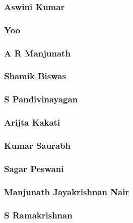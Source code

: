 \documentclass{article}
\begin{document}
\subsubsection{Aswini Kumar}


\subsubsection{Yoo}


\subsubsection{A R Manjunath}


\subsubsection{Shamik Biswas}


\subsubsection{S Pandivinayagan}


\subsubsection{Arijta Kakati}


\subsubsection{Kumar Saurabh}


\subsubsection{Sagar Peswani}


\subsubsection{Manjunath Jayakrishnan Nair}


\subsubsection{S Ramakrishnan}

\end{document}
